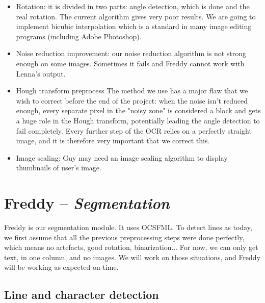 \documentclass[12pt]{report}
\begin{document}
\begin{itemize}

    \item{Rotation}: it is divided in two parts: angle detection, which is done
        and the real rotation. The current algorithm gives very poor results. We
        are going to implement bicubic interpolation which is a standard in many
        image editing programs (including Adobe Photoshop).
    
    \item{Noise reduction improvement}: our noise reduction algorithm is not
        strong enough on some images. Sometimes it fails and Freddy cannot work
        with Lenna's output.

    \item{Hough transform preprocess} The method we use has a major flaw that we wish to correct before the end of
        the project: when the noise isn't reduced enough, every separate pixel
        in the "noisy zone" is considered a block and gets a huge role in the
        Hough transform, potentially leading the angle detection to fail
        completely. Every further step of the OCR relies on a perfectly straight
        image, and it is therefore very important that we correct this.

    \item{Image scaling}: Guy may need an image scaling algorithm to display
        thumbnails of user's image.

\end{itemize}

\chapter{Freddy -- \emph{Segmentation}}

Freddy is our segmentation module. It uses OCSFML.
To detect lines as today, we first assume that all the previous preprocessing steps were done perfectly, which means no artefacts, good rotation, binarization... For now, we can only get text, in one column, and no images. We will work on those situations, and Freddy will be working as expected on time.

\begin{center}
\end{center}

\begin{center}
\end{center}

\section{Line and character detection}
\end{document}
